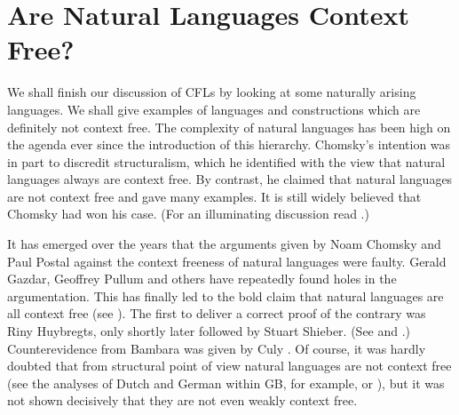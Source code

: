 \section{Are Natural Languages Context Free?}
\label{kap2-6}
%
%
%
We shall finish our discussion of CFLs by looking at some naturally 
arising languages. We shall give examples of languages and constructions 
which are definitely not context free. The complexity of natural 
languages has been high on the agenda ever since the introduction 
of this hierarchy. Chomsky's 
intention was in part to discredit 
structuralism, which he identified with the view that natural 
languages always are context free. By contrast, he claimed that 
natural languages are not context free and gave many examples. 
It is still widely believed that Chomsky had won his case. (For 
an illuminating discussion read \cite{manasterramerkac:concept}.)

It has emerged over the years
that the arguments given by Noam Chomsky and Paul Postal 
against the context freeness of natural languages were faulty. 
Gerald Gazdar, Geoffrey Pullum 
and others have repeatedly found holes in the
argumentation.  This has finally led to the bold claim that 
natural languages are all context free (see 
\cite{gazdarpullumsag:gpsg}). The first to deliver a correct
proof of the contrary was Riny Huybregts, 
only shortly later followed by Stuart Shieber. 
(See \cite{huybregts:overlapping}
and \cite{shieber:evidence}.) Counterevidence from Bambara was 
given by Culy . Of course, it was hardly
doubted that from structural point of view natural languages are
not context free (see the analyses of Dutch and German within
GB, for example, or \cite{bresnanetal:dutch}),
but it was not shown decisively that they are not even weakly
context free.

